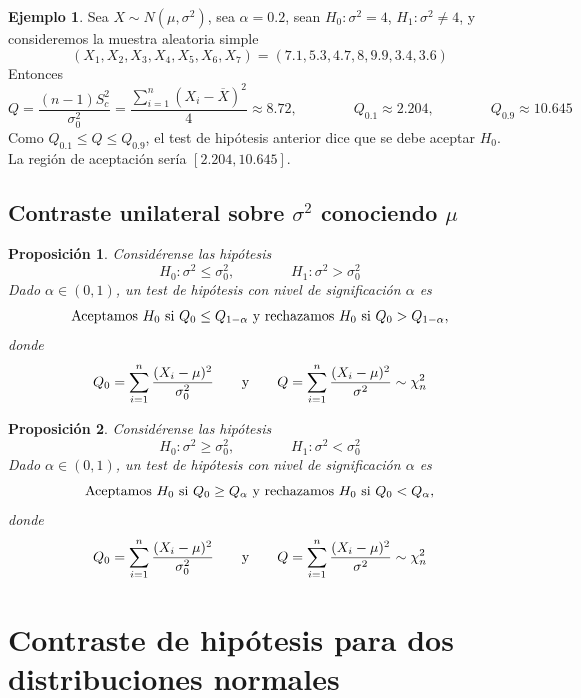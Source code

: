 \documentclass[11pt]{report}
\newtheorem{proposition}{Proposición}
\theoremstyle{definition}
\newtheorem{example}{Ejemplo}
\begin{document}
\begin{example}
    Sea $X \sim N(\mu, \sigma^2)$, sea $\alpha=0.2$, sean
    $H_0 \colon \sigma^2 = 4$, $H_1 \colon \sigma^2 \neq 4$,
    y consideremos la muestra aleatoria simple
    \[(X_1,X_2,X_3,X_4,X_5,X_6,X_7) = (7.1,5.3,4.7,8,9.9,3.4,3.6)\]
    Entonces
    \[Q=\frac{(n-1)S^2_c}{\sigma_0^2} = \frac{\sum_{i=1}^n (X_i-\overline{X})^2}{4} \approx 8.72, \qquad \qquad Q_{0.1} \approx 2.204, \qquad \qquad Q_{0.9} \approx10.645\]
    Como $Q_{0.1} \leq Q \leq Q_{0.9}$, el test de hipótesis anterior dice que se debe aceptar $H_0$. La región de aceptación sería $[2.204,10.645]$.
\end{example}

\subsection{Contraste unilateral sobre \texorpdfstring{$\sigma^2$}{TEXT} conociendo \texorpdfstring{$\mu$}{TEXT}}


\begin{proposition}
    Considérense las hipótesis
    \[H_0 \colon \sigma^2 \leq \sigma^2_0, \qquad \qquad H_1 \colon \sigma^2 > \sigma^2_0\]
    Dado $\alpha \in (0,1)$, un test de hipótesis con nivel de significación $\alpha$ es
    \[\textup{{Aceptamos} } H_0 \textup{ {si} } Q_0 \leq Q_{1-\alpha} \textup{ {y rechazamos} } H_0 \textup{ {si} } Q_0 > Q_{1-\alpha},\]
    donde
    \[Q_0 = \sum_{i=1}^n\frac{(X_i-\mu)^2}{\sigma_0^2} \qquad \textup{y} \qquad Q = \sum_{i=1}^n\frac{(X_i-\mu)^2}{\sigma^2} \sim \chi^2_n\]
\end{proposition}

\begin{proposition}
    Considérense las hipótesis
    \[H_0 \colon \sigma^2 \geq \sigma^2_0, \qquad \qquad H_1 \colon \sigma^2 < \sigma^2_0\]
    Dado $\alpha \in (0,1)$, un test de hipótesis con nivel de significación $\alpha$ es
    \[\textup{{Aceptamos} } H_0 \textup{ {si} } Q_0 \geq Q_{\alpha} \textup{ {y rechazamos} } H_0 \textup{ {si} } Q_0 < Q_{\alpha},\]
    donde
    \[Q_0 = \sum_{i=1}^n\frac{(X_i-\mu)^2}{\sigma_0^2} \qquad \textup{y} \qquad Q = \sum_{i=1}^n\frac{(X_i-\mu)^2}{\sigma^2} \sim \chi^2_n\]
\end{proposition}


\section{Contraste de hipótesis para dos distribuciones normales}
\end{document}
